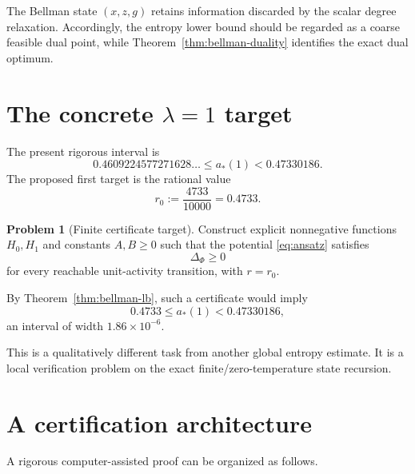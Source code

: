 \documentclass[11pt,a4paper]{article}
\theoremstyle{definition}
\newtheorem{problem}[theorem]{Problem}
\theoremstyle{remark}
\newcommand{\1}{\mathbf 1}
\begin{document}
The Bellman state $(x,z,g)$ retains information discarded by the scalar degree relaxation.
Accordingly, the entropy lower bound should be regarded as a coarse feasible dual point, while
Theorem~\ref{thm:bellman-duality} identifies the exact dual optimum.

\section{The concrete $\lambda=1$ target}

The present rigorous interval is
\begin{equation}
  0.4609224577271628\ldots
  \le a_*(1)
  <0.47330186.
  \label{eq:current-interval}
\end{equation}
The proposed first target is the rational value
\begin{equation}
  r_0:=\frac{4733}{10000}=0.4733.
  \label{eq:r0}
\end{equation}

\begin{problem}[Finite certificate target]
Construct explicit nonnegative functions $H_0,H_1$ and constants $A,B\ge0$ such that the
potential \eqref{eq:ansatz} satisfies
\begin{equation}
  \Delta_\Phi\ge0
  \label{eq:target-ineq}
\end{equation}
for every reachable unit-activity transition, with $r=r_0$.
\end{problem}

By Theorem~\ref{thm:bellman-lb}, such a certificate would imply
\begin{equation}
  \boxed{
  0.4733\le a_*(1)<0.47330186,}
  \label{eq:bomb-interval}
\end{equation}
an interval of width $1.86\times10^{-6}$.

This is a qualitatively different task from another global entropy estimate.  It is a local
verification problem on the exact finite/zero-temperature state recursion.

\section{A certification architecture}

A rigorous computer-assisted proof can be organized as follows.
\end{document}
